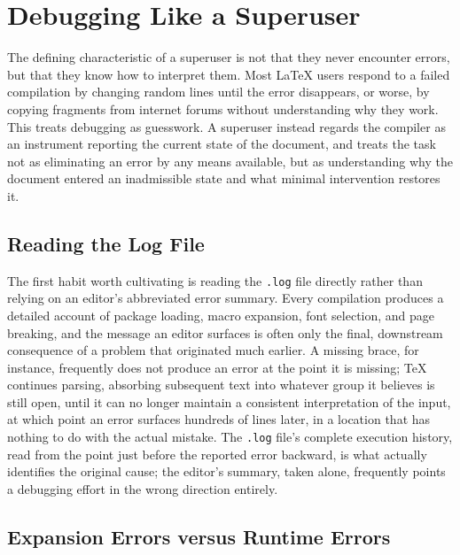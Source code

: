 \hypertarget{chapter-19-debugging-like-a-superuser}{%
\chapter{Debugging Like a Superuser}\label{chapter-19-debugging-like-a-superuser}}

The defining characteristic of a superuser is not that they never encounter errors, but that they know how to interpret them. Most LaTeX users respond to a failed compilation by changing random lines until the error disappears, or worse, by copying fragments from internet forums without understanding why they work. This treats debugging as guesswork. A superuser instead regards the compiler as an instrument reporting the current state of the document, and treats the task not as eliminating an error by any means available, but as understanding why the document entered an inadmissible state and what minimal intervention restores it.

\hypertarget{reading-the-log-file}{%
\section{Reading the Log File}\label{reading-the-log-file}}

The first habit worth cultivating is reading the \texttt{.log} file directly rather than relying on an editor's abbreviated error summary. Every compilation produces a detailed account of package loading, macro expansion, font selection, and page breaking, and the message an editor surfaces is often only the final, downstream consequence of a problem that originated much earlier. A missing brace, for instance, frequently does not produce an error at the point it is missing; TeX continues parsing, absorbing subsequent text into whatever group it believes is still open, until it can no longer maintain a consistent interpretation of the input, at which point an error surfaces hundreds of lines later, in a location that has nothing to do with the actual mistake. The \texttt{.log} file's complete execution history, read from the point just before the reported error backward, is what actually identifies the original cause; the editor's summary, taken alone, frequently points a debugging effort in the wrong direction entirely.

\hypertarget{expansion-errors-versus-runtime-errors}{%
\section{Expansion Errors versus Runtime Errors}\label{expansion-errors-versus-runtime-errors}}

